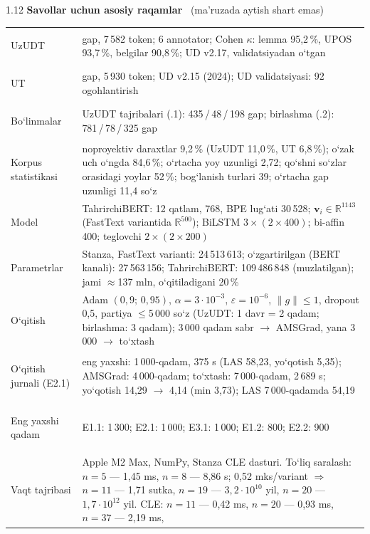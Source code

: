 \documentclass[14pt,a4paper]{extarticle}
\begin{document}
\begin{spacing}{1.12}
\newpage
\noindent\textbf{Savollar uchun asosiy raqamlar} \ {\small (ma’ruzada aytish shart emas)}\\[2pt]
{\small
\begin{tabular}{@{}>{\bfseries\raggedright\arraybackslash}p{3.6cm}>{\raggedright\arraybackslash}p{11.9cm}@{}}
  \toprule
  UzUDT & 684 gap, 7\,582 token; 6 annotator; Cohen $\kappa$: lemma 95,2\,\%, UPOS 93,7\,\%,
          belgilar 90,8\,\%; UD v2.17, validatsiyadan o‘tgan\\
  UT & 500 gap, 5\,930 token; UD v2.15 (2024); UD validatsiyasi: 92 ogohlantirish\\
  Bo‘linmalar & UzUDT tajribalari (.1): 435\,/\,48\,/\,198 gap; birlashma (.2): 781\,/\,78\,/\,325 gap\\
  Korpus statistikasi & noproyektiv daraxtlar 9,2\,\% (UzUDT 11,0\,\%, UT 6,8\,\%); o‘zak uch o‘ngda 84,6\,\%;
          o‘rtacha yoy uzunligi 2,72; qo‘shni so‘zlar orasidagi yoylar 52\,\%; bog‘lanish turlari 39;
          o‘rtacha gap uzunligi 11,4 so‘z\\
  Model & TahrirchiBERT: 12 qatlam, 768, BPE lug‘ati 30\,528; $\mathbf v_i\in\mathbb R^{1143}$
          (FastText variantida $\mathbb R^{500}$); BiLSTM $3\times(2\times400)$; bi-affin 400; teglovchi $2\times(2\times200)$\\
  Parametrlar & Stanza, FastText varianti: 24\,513\,613; o‘zgartirilgan (BERT kanali): 27\,563\,156;
          TahrirchiBERT: 109\,486\,848 (muzlatilgan); jami $\approx$137 mln, o‘qitiladigani 20\,\%\\
  O‘qitish & Adam $(0{,}9;\,0{,}95)$, $\alpha=3\cdot10^{-3}$, $\varepsilon=10^{-6}$, $\|g\|\le1$,
          dropout 0,5, partiya $\le$5\,000 so‘z (UzUDT: 1 davr = 2 qadam; birlashma: 3 qadam);
          3\,000 qadam sabr $\to$ AMSGrad, yana 3\,000 $\to$ to‘xtash\\
  O‘qitish jurnali (E2.1) & eng yaxshi: 1\,000-qadam, 375 s (LAS 58,23, yo‘qotish 5,35); AMSGrad: 4\,000-qadam;
          to‘xtash: 7\,000-qadam, 2\,689 s; yo‘qotish 14,29 $\to$ 4,14 (min 3,73); LAS 7\,000-qadamda 54,19\\
  Eng yaxshi qadam & E1.1: 1\,300; E2.1: 1\,000; E3.1: 1\,000; E1.2: 800; E2.2: 900\\
  Vaqt tajribasi & Apple M2 Max, NumPy, Stanza CLE dasturi. To‘liq saralash: $n=5$ --- 1,45 ms, $n=8$ --- 8,86 s;
          0,52 mks/variant $\Rightarrow$ $n=11$ --- 1,71 sutka, $n=19$ --- $3{,}2\cdot10^{10}$ yil,
          $n=20$ --- $1{,}7\cdot10^{12}$ yil. CLE: $n=11$ --- 0,42 ms, $n=20$ --- 0,93 ms, $n=37$ --- 2,19 ms,

\end{tabular}}
\end{spacing}
\end{document}
